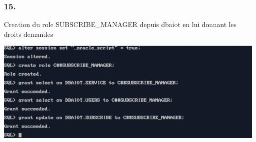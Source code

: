 \subsubsection*{15.}
Creation du role SUBSCRIBE\_MANAGER depuis dbaiot en lui donnant les droits demandes



\begin{center}
    \includegraphics[width=\textwidth]{ScreenShot/Partie4/role.png}
\end{center}

